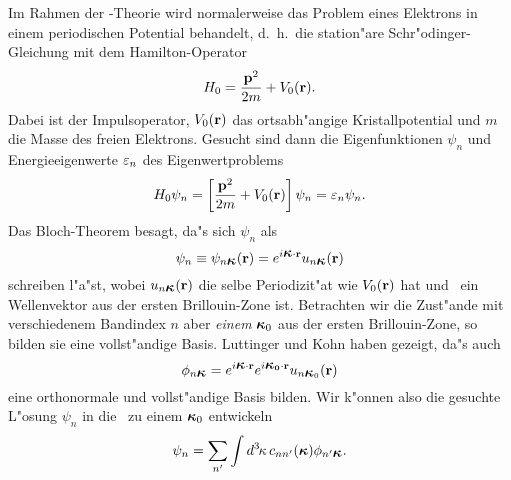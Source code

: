 Im Rahmen der \kdotp-Theorie wird normalerweise das Problem eines Elektrons in
einem periodischen Potential behandelt, d.~h.\ die station"are
Schr"odinger-Gleichung mit dem Hamilton-Operator
%
\begin{displaymath}
  \protect H_{0} = \frac{\mathbf{\protect p}^{2}}{2m} + \protect V_{0}(\mathbf{\protect r}).
\end{displaymath}
%
Dabei ist  der Impulsoperator, $\protect V_{0}(\mathbf{\protect r})$ das
ortsabh"angige Kristallpotential und $m$ die Masse des freien Elektrons.
Gesucht sind dann die Eigenfunktionen $\psi_{n}$ und Energieeigenwerte
$\varepsilon_{n}$ des Eigenwertproblems 
%
\begin{equation}
  \label{eq:standard-SG}
  \protect H_{0} \psi_{n} =  \left[ \frac{\mathbf{\protect p}^{2}}{2m} +
  \protect V_{0}(\mathbf{\protect r}) \right] \psi_{n} = \varepsilon_{n} \psi_{n} .
\end{equation}
%
Das Bloch-Theorem besagt, da"s sich $\psi_{n}$ als
%
\begin{equation}
  \label{eq:bloch}
  \psi_{n} \equiv  \psi_{n\ak}(\vec{r}) = e^{i\sprod{\ak}{r}}
  u_{n\ak}(\vec{r}) 
\end{equation}
%
schreiben l"a"st, wobei $u_{n\ak}(\vec{r})$ die selbe Periodizit"at wie
$\protect V_{0}(\mathbf{\protect r})$ hat und \ak\ ein Wellenvektor aus der ersten
Brillouin-Zone ist. Betrachten wir die Zust"ande mit verschiedenem Bandindex
$n$ aber \emph{einem} $\ak_{0}$ aus der ersten Brillouin-Zone, so bilden sie
eine vollst"andige Basis. Luttinger und Kohn \cite{luko:55} haben gezeigt,
da"s auch 
%
\begin{equation}
  \label{eq:altebasis}
  \altebasis = e^{i\sprod{\ak}{r}} e^{i\sprod{\ak_{0}}{r}} u_{n\ak_{0}}(\vec{r})
\end{equation}
%
eine orthonormale und vollst"andige Basis bilden. Wir k"onnen also die
gesuchte L"osung $\psi_{n}$ in die \altebasis\ zu einem $\ak_{0}$ entwickeln
%
\begin{equation}
  \label{eq:standard-entwicklung}
  \psi_{n} = \sum_{\pri{n}} \int \vdx{\akb} c_{n\pri{n}}(\ak) \paltebasis .
\end{equation}

